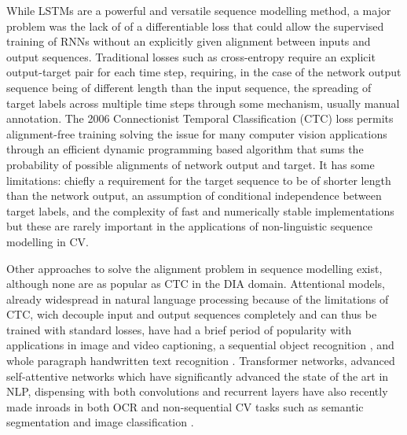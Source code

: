 While LSTMs are a powerful and versatile sequence modelling method, a major
problem was the lack of of a differentiable loss that could allow the
supervised training of RNNs without an explicitly given alignment between
inputs and output sequences. Traditional losses such as cross-entropy require
an explicit output-target pair for each time step, requiring, in the case of the
network output sequence being of different length than the input sequence, the
spreading of target labels across multiple time steps through some mechanism,
usually manual annotation. The 2006 Connectionist Temporal Classification (CTC)
loss \cite{graves2006connectionist} permits alignment-free training solving the
issue for many computer vision applications through an efficient dynamic
programming based algorithm that sums the probability of possible alignments of
network output and target. It has some limitations: chiefly a requirement for
the target sequence to be of shorter length than the network output, an
assumption of conditional independence between target labels, and the
complexity of fast and numerically stable implementations but these are rarely
important in the applications of non-linguistic sequence modelling in CV. 

Other approaches to solve the alignment problem in sequence modelling exist,
although none are as popular as CTC in the DIA domain. Attentional models,
already widespread in natural language processing because of the limitations of
CTC, wich decouple input and output sequences completely and can thus be
trained with standard losses, have had a brief period of popularity with
applications in image \cite{xu2015show} and video \cite{song2017hierarchical}
captioning, a sequential object recognition \cite{ba2014multiple}, and whole
paragraph handwritten text recognition \cite{8270105, bluche2016joint}.
Transformer networks, advanced self-attentive networks which have significantly
advanced the state of the art in NLP, dispensing with both convolutions and
recurrent layers have also recently made inroads in both OCR \cite{transcribr}
and non-sequential CV tasks such as semantic segmentation and image
classification \cite{wu2020visual}.

